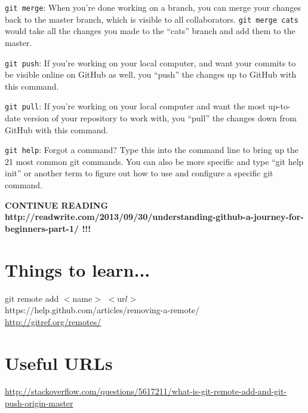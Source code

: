 \documentclass[11pt,a4paper]{article}
\begin{document}
{\tt git merge}: When you’re done working on a branch, you can merge
your changes back to the master branch, which is visible to all
collaborators. {\tt git merge cats} would take all the changes you
made to the ``cats'' branch and add them to the master.

{\tt git push}: If you’re working on your local computer, and want
your commits to be visible online on GitHub as well, you ``push'' the
changes up to GitHub with this command.

{\tt git pull}: If you’re working on your local computer and want the
most up-to-date version of your repository to work with, you ``pull''
the changes down from GitHub with this command.

{\tt git help}: Forgot a command? Type this into the command line to
bring up the 21 most common git commands. You can also be more
specific and type ``git help init'' or another term to figure out how
to use and configure a specific git command.

{\bf 
CONTINUE READING 
http://readwrite.com/2013/09/30/understanding-github-a-journey-for-beginners-part-1/
!!!
}
































\section{Things to learn...}
git remote add $<$name$>$ $<$ur$l>$\\

\noindent
https://help.github.com/articles/removing-a-remote/ \\

\noindent
\href{http://gitref.org/remotes/}{http://gitref.org/remotes/}\\




\section{Useful URLs}
\noindent
\href{http://stackoverflow.com/questions/5617211/what-is-git-remote-add-and-git-push-origin-master}{http://stackoverflow.com/questions/5617211/what-is-git-remote-add-and-git-push-origin-master}
\end{document}
